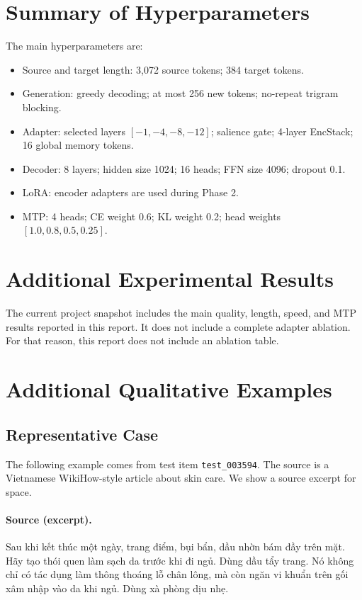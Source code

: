 \documentclass[11pt]{article}
\begin{document}
\section{Summary of Hyperparameters}
\label{app:hparams}

The main hyperparameters are:
\begin{itemize}
    \item Source and target length: 3,072 source tokens; 384 target tokens.
    \item Generation: greedy decoding; at most 256 new tokens; no-repeat trigram blocking.
    \item Adapter: selected layers $[-1,-4,-8,-12]$; salience gate; 4-layer EncStack; 16 global memory tokens.
    \item Decoder: 8 layers; hidden size 1024; 16 heads; FFN size 4096; dropout 0.1.
    \item LoRA: encoder adapters are used during Phase 2.
    \item MTP: 4 heads; CE weight 0.6; KL weight 0.2; head weights $[1.0,0.8,0.5,0.25]$.
\end{itemize}

\section{Additional Experimental Results}

The current project snapshot includes the main quality, length, speed, and MTP results reported in this report.
It does not include a complete adapter ablation.
For that reason, this report does not include an ablation table.

\section{Additional Qualitative Examples}
\label{app:qualitative}

\subsection{Representative Case}

The following example comes from test item \texttt{test\_003594}.
The source is a Vietnamese WikiHow-style article about skin care.
We show a source excerpt for space.

\paragraph{Source (excerpt).}
Sau khi kết thúc một ngày, trang điểm, bụi bẩn, dầu nhờn bám đầy trên mặt.
Hãy tạo thói quen làm sạch da trước khi đi ngủ.
Dùng dầu tẩy trang.
Nó không chỉ có tác dụng làm thông thoáng lỗ chân lông, mà còn ngăn vi khuẩn trên gối xâm nhập vào da khi ngủ.
Dùng xà phòng dịu nhẹ.
\end{document}
